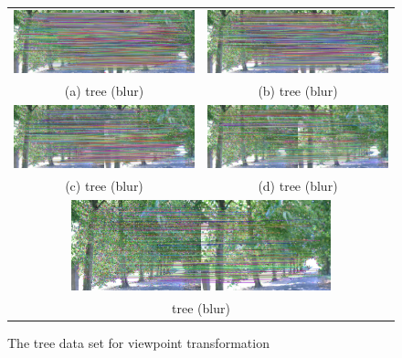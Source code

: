 \begin{figure}[H]  
\begin{tabular}{cc}
  \includegraphics[width=75mm]{figures/tree_final_1_2} &  \includegraphics[width=75mm]{figures/tree_final_1_3} \\
(a) tree (blur) & (b) tree (blur) \\[6pt]
  \includegraphics[width=75mm]{figures/tree_final_1_4} &  \includegraphics[width=75mm]{figures/tree_final_1_5} \\
(c) tree (blur) & (d) tree (blur) \\[6pt]
  \multicolumn{2}{c}{\includegraphics[width=75mm]{figures/tree_final_1_6}} \\
  \multicolumn{2}{c}{tree (blur) }\\[6pt]
\end{tabular}
\caption{The tree data set for viewpoint transformation}\label{fig:epipolar_matching_tree}
\end{figure}


